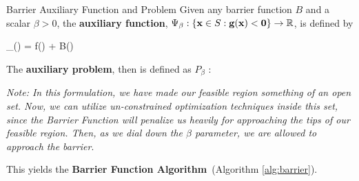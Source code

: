 \begin{defn}{Barrier Auxiliary Function and Problem}{}
Given any barrier function $B$ and a scalar $\beta > 0$, the
\textbf{auxiliary function},  $\Psi_\beta: \{ \mathbf{x} \in S : \mathbf{g}(\mathbf{x}) < \mathbf{0} \} \rightarrow \mathbb{R}$,
is defined by 
\begin{frml}
	\Psi_\beta(\vx) = f(\vx) + \beta * B(\vx)
\end{frml}

\bigskip
The \textbf{auxiliary problem}, then is defined as $P_\beta$ :
\end{defn}

\textit{Note: In this formulation, we have made our feasible region something
of an open set. Now, we can utilize un-constrained optimization techniques
inside this set, since the Barrier Function will penalize us heavily for
approaching the tips of our feasible region. Then, as we dial down the $\beta$ 
parameter, we are allowed to approach the barrier}.



\begin{algorithm}\label{alg:barrier}
\caption{Barrier Function Algorithm}
\end{algorithm}

This yields the \textbf{Barrier Function Algorithm}~(Algorithm \ref{alg:barrier}).





